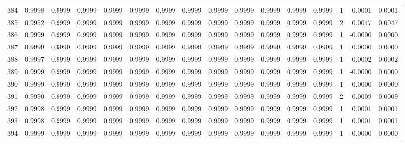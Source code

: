 \begin{tabular}{lrrrrrrrrrrrrrrr}
384 &      0.9998 &  0.9999 &  0.9999 &  0.9999 &  0.9999 &  0.9999 &  0.9999 &  0.9999 &  0.9999 &  0.9999 &   0.9999 &     0.9999 &      1 &                    0.0001 &                     0.0001 \\
385 &      0.9952 &  0.9999 &  0.9999 &  0.9999 &  0.9999 &  0.9999 &  0.9999 &  0.9999 &  0.9999 &  0.9999 &   0.9999 &     0.9999 &      2 &                    0.0047 &                     0.0047 \\
386 &      0.9999 &  0.9999 &  0.9999 &  0.9999 &  0.9999 &  0.9999 &  0.9999 &  0.9999 &  0.9999 &  0.9999 &   0.9999 &     0.9999 &      1 &                   -0.0000 &                     0.0000 \\
387 &      0.9999 &  0.9999 &  0.9999 &  0.9999 &  0.9999 &  0.9999 &  0.9999 &  0.9999 &  0.9999 &  0.9999 &   0.9999 &     0.9999 &      1 &                   -0.0000 &                     0.0000 \\
388 &      0.9997 &  0.9999 &  0.9999 &  0.9999 &  0.9999 &  0.9999 &  0.9999 &  0.9999 &  0.9999 &  0.9999 &   0.9999 &     0.9999 &      1 &                    0.0002 &                     0.0002 \\
389 &      0.9999 &  0.9999 &  0.9999 &  0.9999 &  0.9999 &  0.9999 &  0.9999 &  0.9999 &  0.9999 &  0.9999 &   0.9999 &     0.9999 &      1 &                   -0.0000 &                     0.0000 \\
390 &      0.9999 &  0.9999 &  0.9999 &  0.9999 &  0.9999 &  0.9999 &  0.9999 &  0.9999 &  0.9999 &  0.9999 &   0.9999 &     0.9999 &      1 &                   -0.0000 &                     0.0000 \\
391 &      0.9990 &  0.9999 &  0.9999 &  0.9999 &  0.9999 &  0.9999 &  0.9999 &  0.9999 &  0.9999 &  0.9999 &   0.9999 &     0.9999 &      2 &                    0.0009 &                     0.0009 \\
392 &      0.9998 &  0.9999 &  0.9999 &  0.9999 &  0.9999 &  0.9999 &  0.9999 &  0.9999 &  0.9999 &  0.9999 &   0.9999 &     0.9999 &      1 &                    0.0001 &                     0.0001 \\
393 &      0.9998 &  0.9999 &  0.9999 &  0.9999 &  0.9999 &  0.9999 &  0.9999 &  0.9999 &  0.9999 &  0.9999 &   0.9999 &     0.9999 &      1 &                    0.0001 &                     0.0001 \\
394 &      0.9999 &  0.9999 &  0.9999 &  0.9999 &  0.9999 &  0.9999 &  0.9999 &  0.9999 &  0.9999 &  0.9999 &   0.9999 &     0.9999 &      1 &                   -0.0000 &                     0.0000 \\

\end{tabular}
